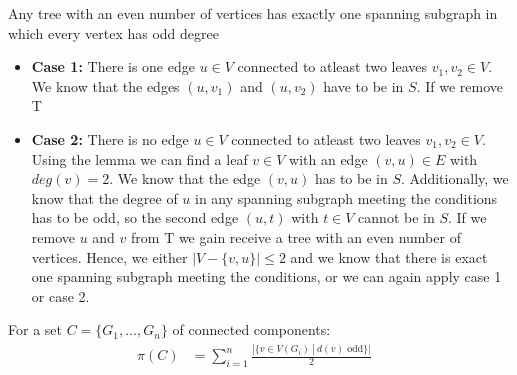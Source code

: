 \documentclass[a4paper]{article}
\begin{document}
\begin{solution}{6}
\begin{theorem}{Any tree with an even number of vertices has exactly one spanning subgraph in which every vertex has odd degree}
			\begin{itemize}
				\item \textbf{Case 1:} There is one edge $u \in V$ connected to atleast two leaves $v_1, v_2 \in V$. \\
				We know that the edges $(u,v_1)$ and $(u,v_2)$ have to be in $S$. If we remove T
				
				\item \textbf{Case 2:} There is no edge $u \in V$ connected to atleast two leaves $v_1, v_2 \in V$. \\
				Using the lemma we can find a leaf $v \in V$ with an edge $(v,u) \in E$ with $deg(v)=2$. 
				We know that the edge $(v,u)$ has to be in $S$. 
				Additionally, we know that the degree of $u$ in any spanning subgraph meeting the conditions has to be odd, so the second edge $(u,t)$ with $t \in V$ cannot be in $S$. 
				If we remove $u$ and $v$ from T we gain receive a tree with an even number of vertices. 
				Hence, we either $|V- \{v,u\}| \leq 2$ and we know that there is exact one spanning subgraph meeting the conditions, or we can again apply case 1 or case 2. 
			\end{itemize}
		\end{theorem}
	\end{solution} 
	\newpage
	\begin{solution}{7}
		For a set $C = \{G_1, ..., G_n\}$ of connected components:\\
		\begin{align}
			\pi(C)&= \sum_{i = 1}^n \frac{|\{v \in V(G_i)\ |\ d(v) \text{ odd}\}|}{2}&
		\end{align}
	\end{solution} 
	\newpage
	\begin{solution}{8}
		
	\end{solution}
	
\end{document}
